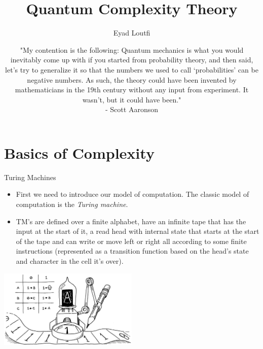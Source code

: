 \documentclass[aspectratio=169]{beamer}
\title{Quantum Complexity Theory}
\author{Eyad Loutfi}
\date{"My contention is the following: Quantum mechanics is what you would inevitably come up with if you started from probability theory, and then said, let's try to generalize it so that the numbers we used to call `probabilities' can be negative numbers. As such, the theory could have been invented by mathematicians in the 19th century without any input from experiment. It wasn't, but it could have been." \\ - Scott Aaronson}
\begin{document}

\begin{frame}
\titlepage
\end{frame}

\section{Basics of Complexity}
\frame{\sectionpage}

\begin{frame}{Turing Machines}
  
  \begin{itemize}
    \item First we need to introduce our model of computation. The classic model of computation is the \emph{Turing machine}. \pause
    \item TM's are defined over a finite alphabet, have an infinite tape that has the input at the start of it, a read head with internal state that starts at the start of the tape and can write or move left or right all according to some finite instructions (represented as a transition function based on the head's state and character in the cell it's over). 
  \end{itemize}
  \begin{center}
    \includegraphics[width=0.5\textwidth, height=0.5\textheight, keepaspectratio]{Turing_pic.png}
  \end{center}
\end{frame}
\end{document}
